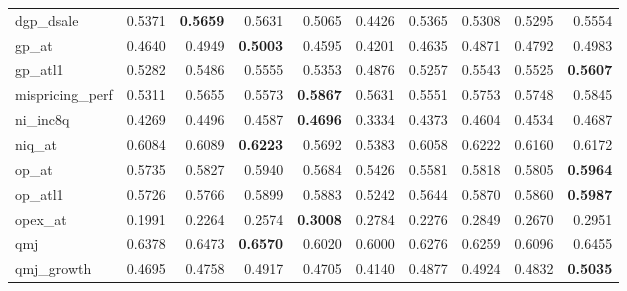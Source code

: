 \begin{longtable}{>{\raggedright\arraybackslash}p{2.6cm}rrrrrrrrr}
dgp\_dsale & 0.5371 & \textbf{\cellcolor{blue!10}0.5659} & \cellcolor{blue!10}0.5631 & 0.5065 & 0.4426 & 0.5365 & 0.5308 & 0.5295 & \cellcolor{blue!10}0.5554 \\
gp\_at & 0.4640 & \cellcolor{blue!10}0.4949 & \textbf{\cellcolor{blue!10}0.5003} & 0.4595 & 0.4201 & 0.4635 & \cellcolor{blue!10}0.4871 & \cellcolor{blue!10}0.4792 & \cellcolor{blue!10}0.4983 \\
gp\_atl1 & 0.5282 & \cellcolor{blue!10}0.5486 & \cellcolor{blue!10}0.5555 & \cellcolor{blue!10}0.5353 & 0.4876 & 0.5257 & \cellcolor{blue!10}0.5543 & \cellcolor{blue!10}0.5525 & \textbf{\cellcolor{blue!10}0.5607} \\
mispricing\_perf & 0.5311 & \cellcolor{blue!10}0.5655 & \cellcolor{blue!10}0.5573 & \textbf{\cellcolor{blue!10}0.5867} & \cellcolor{blue!10}0.5631 & \cellcolor{blue!10}0.5551 & \cellcolor{blue!10}0.5753 & \cellcolor{blue!10}0.5748 & \cellcolor{blue!10}0.5845 \\
ni\_inc8q & 0.4269 & \cellcolor{blue!10}0.4496 & \cellcolor{blue!10}0.4587 & \textbf{\cellcolor{blue!10}0.4696} & 0.3334 & \cellcolor{blue!10}0.4373 & \cellcolor{blue!10}0.4604 & \cellcolor{blue!10}0.4534 & \cellcolor{blue!10}0.4687 \\
niq\_at & 0.6084 & \cellcolor{blue!10}0.6089 & \textbf{\cellcolor{blue!10}0.6223} & 0.5692 & 0.5383 & 0.6058 & \cellcolor{blue!10}0.6222 & \cellcolor{blue!10}0.6160 & \cellcolor{blue!10}0.6172 \\
op\_at & 0.5735 & \cellcolor{blue!10}0.5827 & \cellcolor{blue!10}0.5940 & 0.5684 & 0.5426 & 0.5581 & \cellcolor{blue!10}0.5818 & \cellcolor{blue!10}0.5805 & \textbf{\cellcolor{blue!10}0.5964} \\
op\_atl1 & 0.5726 & \cellcolor{blue!10}0.5766 & \cellcolor{blue!10}0.5899 & \cellcolor{blue!10}0.5883 & 0.5242 & 0.5644 & \cellcolor{blue!10}0.5870 & \cellcolor{blue!10}0.5860 & \textbf{\cellcolor{blue!10}0.5987} \\
opex\_at & 0.1991 & \cellcolor{blue!10}0.2264 & \cellcolor{blue!10}0.2574 & \textbf{\cellcolor{blue!10}0.3008} & \cellcolor{blue!10}0.2784 & \cellcolor{blue!10}0.2276 & \cellcolor{blue!10}0.2849 & \cellcolor{blue!10}0.2670 & \cellcolor{blue!10}0.2951 \\
qmj & 0.6378 & \cellcolor{blue!10}0.6473 & \textbf{\cellcolor{blue!10}0.6570} & 0.6020 & 0.6000 & 0.6276 & 0.6259 & 0.6096 & \cellcolor{blue!10}0.6455 \\
qmj\_growth & 0.4695 & \cellcolor{blue!10}0.4758 & \cellcolor{blue!10}0.4917 & \cellcolor{blue!10}0.4705 & 0.4140 & \cellcolor{blue!10}0.4877 & \cellcolor{blue!10}0.4924 & \cellcolor{blue!10}0.4832 & \textbf{\cellcolor{blue!10}0.5035} \\

\end{longtable}

